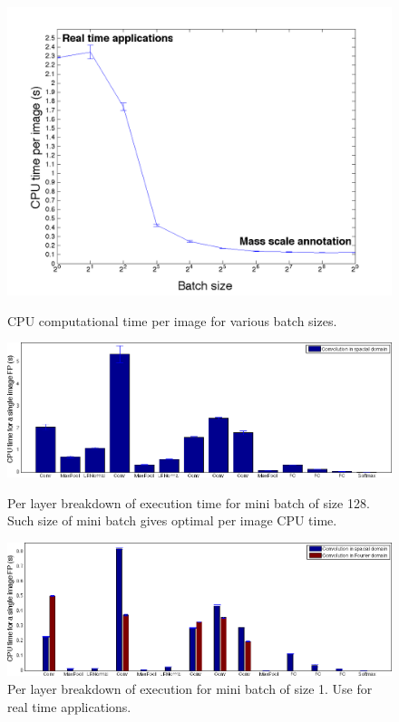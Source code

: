 \documentclass{article}
\begin{document}
\begin{figure}[h]
  \begin{minipage}[b]{0.48\linewidth}
  	\includegraphics[width=\textwidth]{img/eval_per_batch.png}
  	\caption{CPU computational time per image for various batch sizes.}
  \end{minipage}
  \hspace{2mm}
  \begin{minipage}[b]{0.48\linewidth}
  	\includegraphics[width=\textwidth]{img/eval_per_layer_per_batch_128_batch_size.png}
  	\caption{Per layer breakdown of execution time for mini batch of size 128. Such size of mini batch gives optimal per image CPU time.}
  	\vspace{2mm}
	\includegraphics[width=\textwidth]{img/eval_per_layer_per_batch_1_batch_size.png}
  	\caption{Per layer breakdown of execution for mini batch of size 1. Use for real time applications.}
  \end{minipage}
\end{figure}
\end{document}
